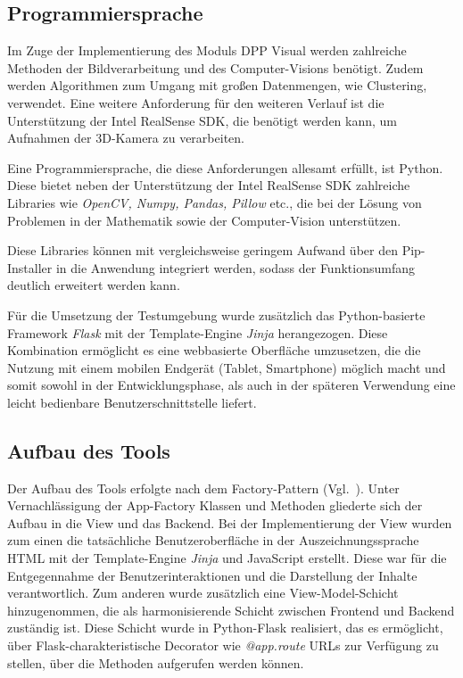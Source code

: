 \documentclass[
    type=Prakikumsbericht,
    status=draft, %
    language=german, %
    bibengine=bibtex,
]{unibwm-inf-thesis}
\begin{document}
    \subsection{Programmiersprache}
    Im Zuge der Implementierung des Moduls DPP Visual werden zahlreiche Methoden der Bildverarbeitung und des
    Computer-Visions benötigt.
    Zudem werden Algorithmen zum Umgang mit großen Datenmengen, wie Clustering, verwendet.
    Eine weitere Anforderung für den weiteren Verlauf ist die Unterstützung der Intel RealSense SDK, die benötigt werden kann,
    um Aufnahmen der 3D-Kamera zu verarbeiten.

    Eine Programmiersprache, die diese Anforderungen allesamt erfüllt, ist Python.
    Diese bietet neben der Unterstützung der Intel RealSense SDK zahlreiche Libraries wie \textit{OpenCV, Numpy, Pandas, Pillow} etc., die bei der Lösung von Problemen in der Mathematik sowie der Computer-Vision unterstützen.

    Diese Libraries können mit vergleichsweise geringem Aufwand über den Pip-Installer in die Anwendung integriert
    werden, sodass der Funktionsumfang deutlich erweitert werden kann.

    Für die Umsetzung der Testumgebung wurde zusätzlich das Python-basierte Framework \textit{Flask} mit der
    Template-Engine \textit{Jinja} herangezogen.
    Diese Kombination ermöglicht es eine webbasierte Oberfläche umzusetzen, die die Nutzung mit einem mobilen Endgerät
    (Tablet, Smartphone) möglich macht und somit sowohl in der Entwicklungsphase, als auch in der späteren Verwendung eine leicht bedienbare Benutzerschnittstelle liefert.

    \subsection{Aufbau des Tools} \label{subsec:aufbau-des-tools}
    Der Aufbau des Tools erfolgte nach dem Factory-Pattern (Vgl.~\citep{FlaskDevelopero.J.}).
    Unter Vernachlässigung der App-Factory Klassen und Methoden gliederte sich der Aufbau in die View und das Backend.
    Bei der Implementierung der View wurden zum einen die tatsächliche Benutzeroberfläche in der Auszeichnungssprache
    HTML mit der Template-Engine \textit{Jinja} und JavaScript erstellt.
    Diese war für die Entgegennahme der Benutzerinteraktionen und die Darstellung der Inhalte verantwortlich.
    Zum anderen wurde zusätzlich eine View-Model-Schicht hinzugenommen, die als harmonisierende Schicht zwischen
    Frontend und Backend zuständig ist.
    Diese Schicht wurde in Python-Flask realisiert, das es ermöglicht, über Flask-charakteristische Decorator wie
    \textit{@app.route} URLs zur Verfügung zu stellen, über die Methoden aufgerufen werden können.
\end{document}
